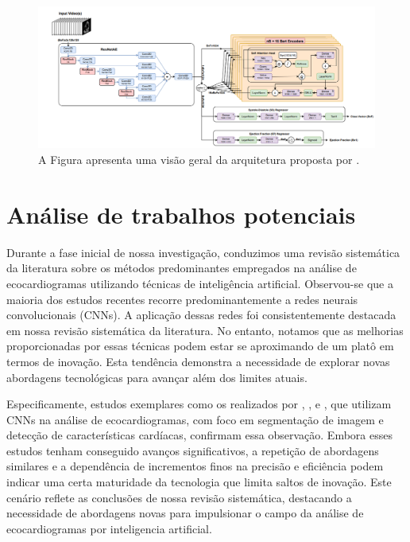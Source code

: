 \begin{figure}[!ht]
   \centering
   \includegraphics[width=1.0\linewidth]{capitulos/figuras/reynald.png}
   \caption{A Figura apresenta uma visão geral da arquitetura proposta por \textcite{Reynald}.}
   \label{fig:reynaldarq}
\end{figure}

\section{Análise de trabalhos potenciais}
\label{Avaliação de trabalhos potenciais}

Durante a fase inicial de nossa investigação, conduzimos uma revisão sistemática da literatura sobre os métodos predominantes empregados na análise de ecocardiogramas utilizando técnicas de inteligência artificial. Observou-se que a maioria dos estudos recentes recorre predominantemente a redes neurais convolucionais (CNNs). A aplicação  dessas redes foi consistentemente destacada em nossa revisão sistemática da literatura. No entanto, notamos que as melhorias proporcionadas por essas técnicas podem estar se aproximando de um platô em termos de inovação. Esta tendência demonstra a necessidade de explorar novas abordagens tecnológicas para avançar além dos limites atuais.

Especificamente, estudos exemplares como os realizados por \textcite{LIU2021101873}, \textcite{9648607}, e \textcite{9335592}, que utilizam CNNs na análise de ecocardiogramas, com foco em segmentação de imagem e detecção de características cardíacas, confirmam essa observação. Embora esses estudos tenham conseguido avanços significativos, a repetição de abordagens similares e a dependência de incrementos finos na precisão e eficiência podem indicar uma certa maturidade da tecnologia que limita saltos de inovação. Este cenário reflete as conclusões de nossa revisão sistemática, destacando a necessidade de abordagens novas para impulsionar o campo da análise de ecocardiogramas por inteligencia artificial.

